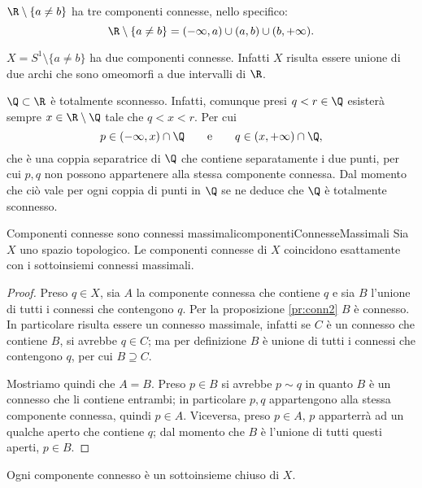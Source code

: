 \begin{ese}
	\(\R\setminus\{a\neq b\}\) ha tre componenti connesse, nello specifico:
	\[
		\R\setminus\{a\neq b\} = (-\infty,a)\cup (a,b) \cup (b,+\infty).
	\]
\end{ese}

\begin{ese}
	\(X=S^1\setminus\{a\neq b\}\) ha due componenti connesse.
	Infatti \(X\) risulta essere unione di due archi che sono omeomorfi a due intervalli di \(\R\).
\end{ese}

\begin{ese}
	\(\Q\subset\R\) è totalmente sconnesso.
	Infatti, comunque presi \(q<r\in\Q\) esisterà sempre \(x\in \R\setminus \Q\) tale che \(q<x<r\).
	Per cui
	\[
		p\in (-\infty,x) \cap \Q \qquad\text{e}\qquad q\in (x,+\infty)\cap \Q,
	\]
	che è una coppia separatrice di \(\Q\) che contiene separatamente i due punti, per cui \(p,q\) non possono appartenere alla stessa componente connessa.
	Dal momento che ciò vale per ogni coppia di punti in \(\Q\) se ne deduce che \(\Q\) è totalmente sconnesso.
\end{ese}

\begin{prop}{Componenti connesse sono connessi massimali}{componentiConnesseMassimali}
	Sia \(X\) uno spazio topologico.
	Le componenti connesse di \(X\) coincidono esattamente con i sottoinsiemi connessi massimali.
\end{prop}

\begin{proof}
	Preso \(q\in X\), sia \(A\) la componente connessa che contiene \(q\) e sia \(B\) l'unione di tutti i connessi che contengono \(q\).
	Per la proposizione \ref{pr:conn2} \(B\) è connesso.
	In particolare risulta essere un connesso massimale, infatti se \(C\) è un connesso che contiene \(B\), si avrebbe \(q\in C\); ma per definizione \(B\) è unione di tutti i connessi che contengono \(q\), per cui \(B\supseteq C\).

	Mostriamo quindi che \(A=B\).
	Preso \(p\in B\) si avrebbe \(p\sim q\) in quanto \(B\) è un connesso che li contiene entrambi; in particolare \(p,q\) appartengono alla stessa componente connessa, quindi \(p\in A\).
	Viceversa, preso \(p\in A\), \(p\) apparterrà ad un qualche aperto che contiene \(q\); dal momento che \(B\) è l'unione di tutti questi aperti, \(p\in B\).
\end{proof}

\begin{pr}\label{pr:compConn1}
	Ogni componente connesso è un sottoinsieme chiuso di \(X\).
\end{pr}

